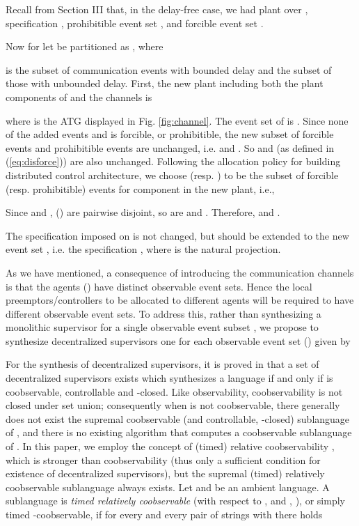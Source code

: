


Recall from Section III that, in the delay-free case, we had
plant  over ,
specification , prohibitible event set ,
and forcible event set . 

Now for  let  be partitioned as
, where

is the subset of communication events with bounded
delay and  the subset of those with unbounded delay.
First, the new plant  including both the plant components of  and the channels is

where  is the ATG displayed in Fig. \ref{fig:channel}.
The event set  of  is .
Since none of the added events  and  is
forcible, or prohibitible, the new subset of forcible events and prohibitible
events are unchanged, i.e.  and
. So  and 
(as defined in (\ref{eq:disforce})) are also unchanged. Following the allocation policy for building distributed
control architecture, we choose  (resp. )
to be the subset of forcible (resp. prohibitible) events for component  in
the new plant, i.e.,

Since  and , ()
are pairwise disjoint, so are   and .
Therefore, 
and .








The specification imposed on  is not changed, but should be extended
to the new event set , i.e. the specification
,
where  is the natural projection.


As we have mentioned, a consequence of
introducing the communication channels is that the agents  ()
have distinct observable event sets. Hence the local preemptors/controllers to be allocated to different
agents will be required to have different observable event sets. To address this, rather than synthesizing
a monolithic supervisor for a single observable event subset , we propose to synthesize  decentralized
supervisors one for each observable event set  () given by


 For the synthesis of decentralized supervisors,
it is proved in \cite{RudWon:1992,ParkChoi09} that a set of decentralized supervisors exists
which synthesizes a language  if and only if 
is coobservable, controllable and -closed. Like observability, coobservability is not closed under
set union; consequently when  is not coobservable, there generally does not exist the supremal coobservable
(and controllable, -closed) sublanguage of , and there is no
existing algorithm that computes a coobservable sublanguage of . In this paper, we employ the concept
of (timed) relative coobservability \cite{CaiZW16}, which is stronger
than coobservability (thus only a sufficient condition for existence of
decentralized supervisors), but the supremal (timed) relatively coobservable sublanguage always exists.
Let  and 
be an ambient language. A sublanguage  is {\it timed relatively coobservable} (with respect to , 
and , ), or simply timed -coobservable, if
for every  and
every pair of strings  with 
there holds

